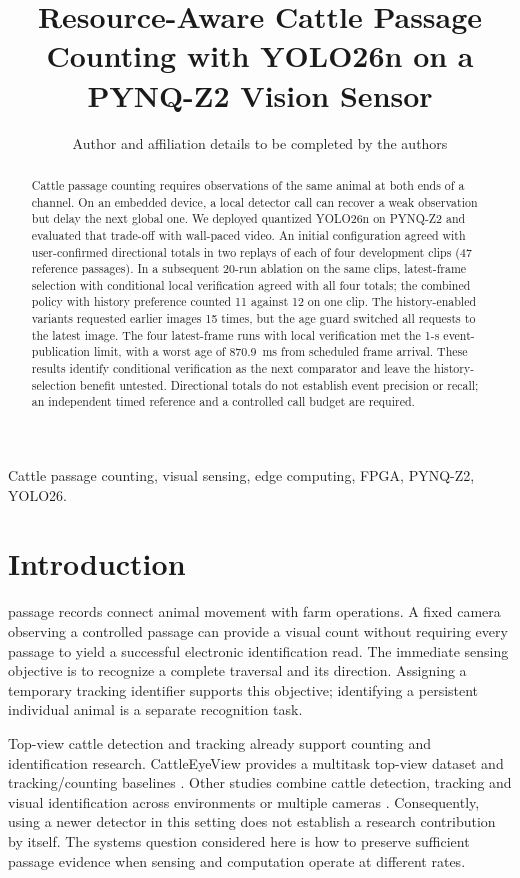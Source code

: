 \documentclass[journal]{IEEEtran}
\title{Resource-Aware Cattle Passage Counting with YOLO26n on a PYNQ-Z2 Vision Sensor}
\author{Author and affiliation details to be completed by the authors}
\begin{document}
\maketitle
\begin{abstract}
Cattle passage counting requires observations of the same animal at both ends of a channel. On an embedded device, a local detector call can recover a weak observation but delay the next global one. We deployed quantized YOLO26n on PYNQ-Z2 and evaluated that trade-off with wall-paced video. An initial configuration agreed with user-confirmed directional totals in two replays of each of four development clips (47 reference passages). In a subsequent 20-run ablation on the same clips, latest-frame selection with conditional local verification agreed with all four totals; the combined policy with history preference counted 11 against 12 on one clip. The history-enabled variants requested earlier images 15 times, but the age guard switched all requests to the latest image. The four latest-frame runs with local verification met the 1-s event-publication limit, with a worst age of 870.9~ms from scheduled frame arrival. These results identify conditional verification as the next comparator and leave the history-selection benefit untested. Directional totals do not establish event precision or recall; an independent timed reference and a controlled call budget are required.

\end{abstract}
\begin{IEEEkeywords}
Cattle passage counting, visual sensing, edge computing, FPGA, PYNQ-Z2, YOLO26.
\end{IEEEkeywords}

\section{Introduction}
 passage records connect animal movement with farm operations. A fixed camera observing a controlled passage can provide a visual count without requiring every passage to yield a successful electronic identification read. The immediate sensing objective is to recognize a complete traversal and its direction. Assigning a temporary tracking identifier supports this objective; identifying a persistent individual animal is a separate recognition task.

Top-view cattle detection and tracking already support counting and identification research. CattleEyeView provides a multitask top-view dataset and tracking/counting baselines \cite{cattleeyeview}. Other studies combine cattle detection, tracking and visual identification across environments or multiple cameras \cite{cattle_id_2024,black_cattle_2025}. Consequently, using a newer detector in this setting does not establish a research contribution by itself. The systems question considered here is how to preserve sufficient passage evidence when sensing and computation operate at different rates.
\end{document}
